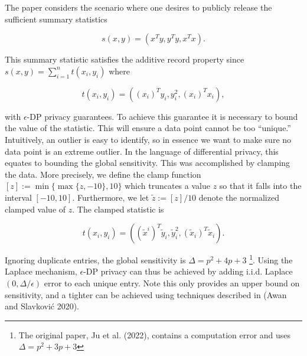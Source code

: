 The paper considers the scenario where one desires to publicly release the
sufficient summary statistics

\[
s(x,y) = (x^Ty, y^Ty, x^Tx).
\]

This summary statistic satisfies the additive record property since \(s(x,y) = \sum_{i=1}^{n} t(x_i, y_i)\)
where

\[
t(x_i,y_i) = ((x_{i})^T y_i, y_i^2, (x_{i})^T x_i),
\]

with \(\epsilon\)-DP privacy guarantees. To achieve this guarantee it is
necessary to bound the value of the statistic. This will ensure
a data point cannot be too ``unique.'' Intuitively, an outlier is
easy to identify, so in essence we want to make sure no data point
is an extreme outlier. In the language of differential
privacy, this equates to bounding the global sensitivity. This was accomplished
by clamping the data. More precisely, we define
the clamp function \([z] := \min\{\max\{z,-10\}, 10\}\) which truncates a value
\(z\) so that it falls into the interval \([-10,10]\). Furthermore, we let \(\tilde{z} := [z]/10\)
denote the normalized clamped value of \(z\). The clamped statistic is

\[
t(x_i,y_i) = ((\tilde{x}^{i})^T \tilde{y}_i, \tilde{y}_i^2, (\tilde{x}_{i})^T \tilde{x}_i).
\]

Ignoring duplicate entries, the global sensitivity is \(\Delta = p^2 + 4p + 3\) \footnote{The original paper, Ju et al. (2022), contains a computation error and uses \(\Delta = p^2 + 3p + 3\)}.
Using the Laplace mechanism, \(\epsilon\)-DP privacy can thus be achieved by adding i.i.d. Laplace\((0, \Delta/\epsilon)\)
error to each unique entry. Note this only provides an upper bound on sensitivity, and a
tighter can be achieved using techniques described in (Awan and Slavković 2020).

